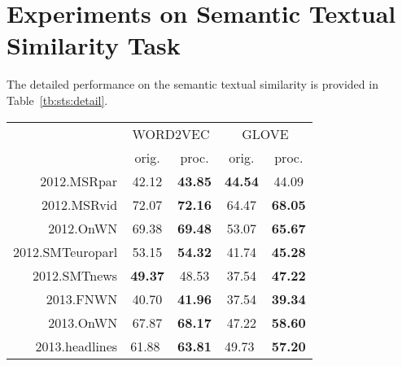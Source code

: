 \documentclass{article} \usepackage{acl2017,times}
\begin{document}
\section{Experiments on Semantic Textual Similarity Task}
\label{app:sts}

The detailed performance on the semantic textual similarity is provided in Table~\ref{tb:sts:detail}.



\begin{table}[!h]
\centering
\begin{tabular}{|r||c|c||c|c|}
\hline
\multirow{2}{*}{}     & \multicolumn{2}{c||}{WORD2VEC}                                    & \multicolumn{2}{c|}{GLOVE}                                       \\ \cline{2-5} 
                      & orig.                      & proc.                               & orig.                      & proc.                               \\ \hline
2012.MSRpar           & 42.12                      & \textbf{43.85}                      & \textbf{44.54}             & 44.09                               \\ \hline
2012.MSRvid           & 72.07                      & \textbf{72.16}                      & 64.47                      & \textbf{68.05}                      \\ \hline
2012.OnWN             & 69.38                      & \textbf{69.48}                      & 53.07                      & \textbf{65.67}                      \\ \hline
2012.SMTeuroparl      & 53.15                      & \textbf{54.32}                      & 41.74                      & \textbf{45.28}                      \\ \hline
2012.SMTnews          & \textbf{49.37}             & 48.53                               & 37.54                      & \textbf{47.22}                      \\ \hline
2013.FNWN             & 40.70                      & \textbf{41.96}                      & 37.54                      & \textbf{39.34}                      \\ \hline
2013.OnWN             & 67.87                      & \textbf{68.17}                      & 47.22                      & \textbf{58.60}                      \\ \hline
2013.headlines        & \multicolumn{1}{l|}{61.88} & \multicolumn{1}{l|}{\textbf{63.81}} & \multicolumn{1}{l|}{49.73} & \multicolumn{1}{l|}{\textbf{57.20}} \\ \hline

\end{tabular}
\end{table}
\end{document}
